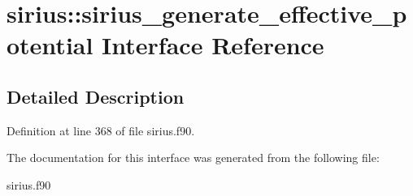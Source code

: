 \hypertarget{interfacesirius_1_1sirius__generate__effective__potential}{}\section{sirius\+:\+:sirius\+\_\+generate\+\_\+effective\+\_\+potential Interface Reference}
\label{interfacesirius_1_1sirius__generate__effective__potential}


\subsection{Detailed Description}


Definition at line 368 of file sirius.\+f90.



The documentation for this interface was generated from the following file\+:\begin{DoxyCompactItemize}
\item 
sirius.\+f90\end{DoxyCompactItemize}

